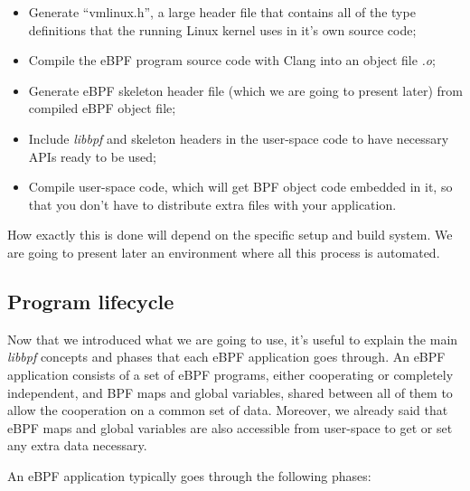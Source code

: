 \begin{itemize}
	\item Generate ``vmlinux.h'', a large header file that contains all of the type
		definitions that the running Linux kernel uses in it’s own source code; 
	\item Compile the eBPF program source code with Clang into an object file
		\textit{.o};
	\item Generate eBPF skeleton header file (which we are going to present later)
		from compiled eBPF object file;
	\item Include \textit{libbpf} and skeleton headers in the user-space code to have
		necessary APIs ready to be used;
	\item Compile user-space code, which will get BPF object code embedded in it, so
		that you don’t have to distribute extra files with your application.
\end{itemize}

How exactly this is done will depend on the specific setup and build system.
We are going to present later an environment where all this process is automated.

\subsection{Program lifecycle}

Now that we introduced what we are going to use, it’s useful to explain the main \textit{libbpf} concepts and phases that each eBPF application goes through. 
An eBPF application consists of a set of eBPF programs, either cooperating or completely independent, and BPF maps and global variables, shared between all of them to allow the cooperation on a common set of data. 
Moreover, we already said that eBPF maps and global variables are also accessible from user-space to get or set any extra data necessary. 

An eBPF application typically goes through the following phases:

